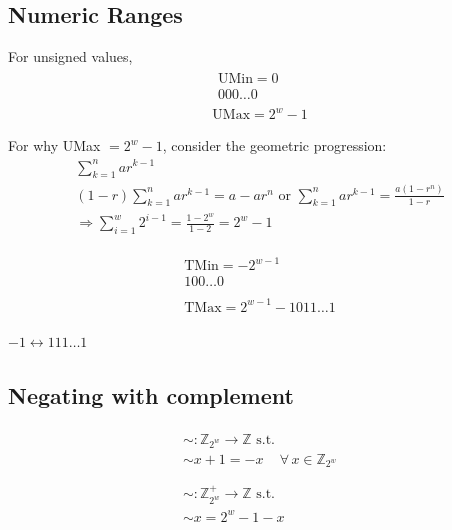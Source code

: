 \documentclass[10pt]{amsart}
\begin{document}
\begin{multicols*}{2}
\subsection{Numeric Ranges}

For unsigned values, 
\[
\begin{gathered}
\begin{gathered} 
	\text{UMin} = 0 \\
	000 \dots 0 
\end{gathered} \\
\text{UMax} = 2^w - 1  
\end{gathered}
\]

For why UMax $=2^w -1$, consider the geometric progression:
\[
\begin{gathered}
	\sum_{k=1}^n ar^{k-1} \\
	(1-r) \sum_{k=1}^n ar^{k-1} = a-ar^n \text{ or } \sum_{k=1}^n ar^{k-1} = \frac{a(1-r^n) }{1-r} \\
	\Longrightarrow \sum_{i=1}^w 2^{i-1} = \frac{1-2^w}{1-2} = 2^w - 1
\end{gathered}
\]

\[
\begin{gathered}
\begin{gathered} 
\text{TMin} = -2^{w-1} \\
100 \dots 0 
\end{gathered} \\
\begin{gathered} 
\text{TMax} = 2^{w-1} - 1
011\dots 1
\end{gathered}
\end{gathered} 
\]

$-1 \leftrightarrow 111 \dots 1$


\subsection{Negating with complement}

\begin{equation}
\begin{gathered}
\begin{gathered} 
\sim : \mathbb{Z}_{2^w} \to \mathbb{Z} \text{ s.t. } \\
\sim x + 1 = -x \quad \, \forall \, x \in \mathbb{Z}_{2^w} \\
\end{gathered}  \\
\begin{gathered} 
\sim : \mathbb{Z}^+_{2^w} \to \mathbb{Z} \text{ s.t. } \\
\sim x = 2^w- 1 -x 
\end{gathered}
\end{gathered}
\end{equation}


\end{multicols*}
\end{document}
